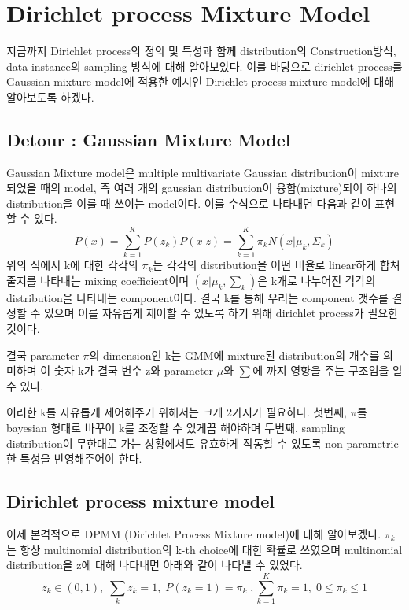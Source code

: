 \documentclass[a4paper]{oblivoir}
\begin{document}
\section{Dirichlet process Mixture Model}
지금까지 Dirichlet process의 정의 및 특성과 함께 distribution의 Construction방식, data-instance의 sampling 방식에 대해 알아보았다. 이를 바탕으로 dirichlet process를 Gaussian mixture model에 적용한 예시인 Dirichlet process mixture model에 대해 알아보도록 하겠다.
\subsection{Detour : Gaussian Mixture Model}
Gaussian Mixture model은 multiple multivariate Gaussian distribution이 mixture 되었을 때의 model, 즉 여러 개의 gaussian distribution이 융합(mixture)되어 하나의 distribution을 이룰 때 쓰이는 model이다. 이를 수식으로 나타내면 다음과 같이 표현할 수 있다.
\begin{equation}
P(x) = \sum^{K}_{k=1}P(z_{k})P(x|z) = \sum^{K}_{k=1}\pi_{k}N(x|\mu_{k},\Sigma_{k})
\end{equation}
위의 식에서 k에 대한 각각의 $\pi_{k}$는 각각의 distribution을 어떤 비율로 linear하게 합쳐줄지를 나타내는 mixing coefficient이며 $(x|\mu_{k},\sum_{k})$은 k개로 나누어진 각각의 distribution을 나타내는 component이다. 결국 k를 통해 우리는 component 갯수를 결정할 수 있으며 이를 자유롭게 제어할 수 있도록 하기 위해 dirichlet process가 필요한 것이다. 

결국 parameter $\pi$의 dimension인 k는 GMM에 mixture된 distribution의 개수를 의미하며 이 숫자 k가 결국 변수 z와 parameter $\mu$와 $\sum$에 까지 영향을 주는 구조임을 알 수 있다. 

이러한 k를 자유롭게 제어해주기 위해서는 크게 2가지가 필요하다. 첫번째, $\pi$를 bayesian 형태로 바꾸어 k를 조정할 수 있게끔 해야하며 두번째, sampling distribution이 무한대로 가는 상황에서도 유효하게 작동할 수 있도록 non-parametric한 특성을 반영해주어야 한다.

\subsection{Dirichlet process mixture model}
이제 본격적으로 DPMM (Dirichlet Process Mixture model)에 대해 알아보겠다. $\pi_{k}$는 항상 multinomial distribution의 k-th choice에 대한 확률로 쓰였으며 multinomial distribution을 z에 대해 나타내면 아래와 같이 나타낼 수 있었다.
\begin{equation}
z_{k} \in ({0,1}), \;\sum_{k}z_{k}=1,\; P(z_{k}=1)=\pi_{k}\;,\sum^{K}_{k=1}\pi_{k}=1,\; 0\leq \pi_{k} \leq 1
\end{equation}
\end{document}
